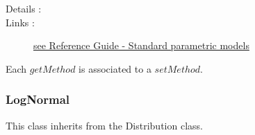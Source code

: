 \begin{description}
\item[Details :]  \rule{0pt}{1em}
  \begin{description}
  \item density function :
    $$
    f(x) = \frac{e^{\left(\frac{x-\alpha}{\beta}\right)}}
    {\beta\left(1+ e^{\left(\frac{x-\alpha}{\beta}\right)}\right)^2}\boldsymbol{1}_{[\alpha,+\infty[}(x)
    $$
  \item relation between parameters set :
    \begin{eqnarray*}
      \mu                                        &      =       &   \alpha              \\
      \sigma     &  =   &       \sqrt{\frac{1}{3}\pi^2\beta^2}
    \end{eqnarray*}
    \begin{align*}
      \mbox{where}
      &&
      \mu = \Expect{X}
      &&
      \sigma = \sqrt{\Var X }
    \end{align*}
  \end{description}

\item[Links :]  \rule{0pt}{1em}
  \href{OpenTURNS_ReferenceGuide.pdf}{see Reference Guide - Standard parametric models}
\end{description}


Each  $getMethod$  is associated to a $setMethod$.

\newpage \subsubsection{LogNormal}

This class inherits from the Distribution class.

